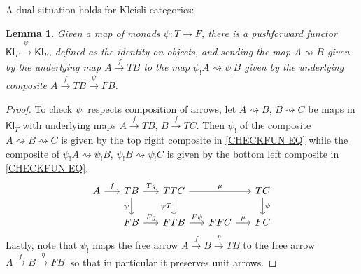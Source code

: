 \documentclass[a4paper,10pt
,draft
]{article}%
\numberwithin{equation}{section}
\numberwithin{figure}{section}
\newtheorem{lemma}[equation]{Lemma}%
\theoremstyle{definition} %
\newcommand{\Kl}{\mathsf{Kl}}
\newcommand{\1}{\ensuremath{\mathbbm 1}}%
\begin{document}
A dual situation holds for Kleisli categories:
\begin{lemma}
      \label{KLEISLIPUSH LEM}
      Given a map of monads $\psi \colon T \to F$,
      there is a pushforward functor
      $\mathsf{Kl}_T \xrightarrow{\psi_!} \mathsf{Kl}_F$,
      defined as the identity on objects,
      and sending the map $A \rightsquigarrow B$
      given by the underlying map $A \xrightarrow{f} TB$
      to the map $\psi_!A \rightsquigarrow \psi_!B$
      given by the underlying composite
      $A \xrightarrow{f} TB \xrightarrow{\psi} FB$.
\end{lemma}
\begin{proof}
      To check $\psi_!$ respects composition of arrows, let
      $A \rightsquigarrow B$,
      $B \rightsquigarrow C$
      be maps in $\Kl_T$ with
      underlying maps
      $A \xrightarrow{f} TB$,
      $B \xrightarrow{f} TC$.
      Then $\psi_!$ of the composite 
      $A \rightsquigarrow B \rightsquigarrow C$
      is given by the top right composite in \eqref{CHECKFUN EQ}
      while the composite of 
      $\psi_!A \rightsquigarrow \psi_! B$,
      $\psi_! B \rightsquigarrow \psi_! C$
      is given by the bottom  left composite in \eqref{CHECKFUN EQ}.
      \begin{equation}\label{CHECKFUN EQ}
            \begin{tikzcd}[column sep = 1.55em]
                  A \ar{r}{f} 
                  &
                  TB \ar{r}{Tg} \ar{d}[swap]{\psi}
                  &
                  TTC \ar{rr}{\mu}  \ar{d}[swap]{\psi T}
                  &&
                  TC \ar{d}{\psi}
                  \\
                  &
                  FB \ar{r}{Fg}
                  &
                  FTB \ar{r}{F\psi}
                  &
                  FFC \ar{r}{\mu}
                  &
                  FC
            \end{tikzcd}
      \end{equation}
      Lastly, note that $\psi_!$ maps the free arrow 
      $A \xrightarrow{f} B \xrightarrow{\eta} TB$
      to the free arrow
      $A \xrightarrow{f} B \xrightarrow{\eta} FB$,
      so that in particular it preserves unit arrows.
\end{proof}
\end{document}
